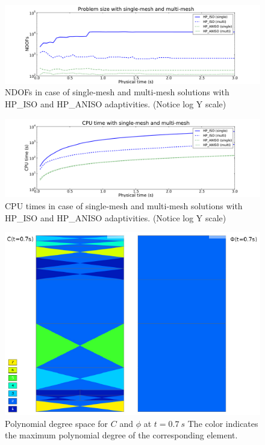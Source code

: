 \begin{figure}
  \begin{centering}
  \includegraphics[width=\columnwidth]{singlemulti_dof}
  \caption{\label{fig:singlemultidof} NDOFs in case 
  of single-mesh and multi-mesh solutions with HP\_ISO
  and HP\_ANISO adaptivities. (Notice log Y scale)}
  \end{centering}
\end{figure}
\begin{figure}
  \begin{centering}
  \includegraphics[width=\columnwidth]{singlemulti_cpu}
  \caption{\label{fig:singlemulticpu} CPU times in case
  of single-mesh and multi-mesh solutions with HP\_ISO
  and HP\_ANISO adaptivities. (Notice log Y scale)}
  \end{centering}
\end{figure}
\begin{figure}
  \begin{centering}
  \includegraphics[width=.75\columnwidth]{poly}
  \caption{\label{fig:poly} Polynomial degree space
  for $C$ and $\phi$ at $t=0.7\ s$ The color indicates
  the maximum polynomial degree of the corresponding element.}
  \end{centering}
\end{figure}

